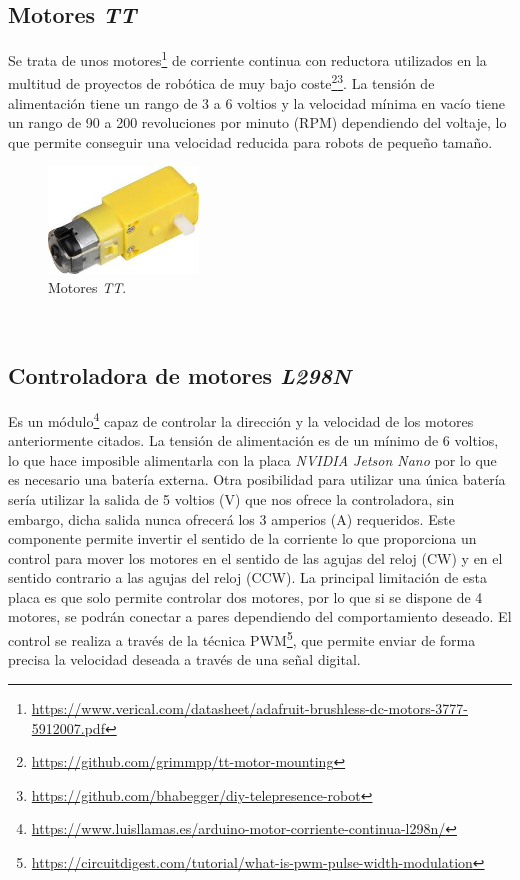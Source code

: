 \subsection{Motores \textit{TT}}
\label{subsection:motortt}
Se trata de unos motores\footnote{\url{https://www.verical.com/datasheet/adafruit-brushless-dc-motors-3777-5912007.pdf}} de corriente continua con reductora utilizados en la multitud de proyectos de robótica de muy bajo coste\footnote{\url{https://github.com/grimmpp/tt-motor-mounting}}\footnote{\url{https://github.com/bhabegger/diy-telepresence-robot}}. La tensión de alimentación tiene un rango de 3 a 6 voltios y la velocidad mínima en vacío tiene un rango de 90 a 200 revoluciones por minuto (RPM) dependiendo del voltaje, lo que permite conseguir una velocidad reducida para robots de pequeño tamaño.\\

\begin{figure} [h!]
	\begin{center}
		\includegraphics[width=4cm]{figs/motorTT}
	\end{center}
	\caption{Motores \textit{TT}.}
	\label{fig:motorTT}
\end{figure}\

\subsection{Controladora de motores \textit{L298N}}
\label{subsection:l298n}
Es un módulo\footnote{\url{https://www.luisllamas.es/arduino-motor-corriente-continua-l298n/}} capaz de controlar la dirección y la velocidad de los motores anteriormente citados. La tensión de alimentación es de un mínimo de 6 voltios, lo que hace imposible alimentarla con la placa \textit{NVIDIA Jetson Nano} por lo que es necesario una batería externa. Otra posibilidad para utilizar una única batería sería utilizar la salida de 5 voltios (V) que nos ofrece la controladora, sin embargo, dicha salida nunca ofrecerá los 3 amperios (A) requeridos. Este componente permite invertir el sentido de la corriente lo que proporciona un control para mover los motores en el sentido de las agujas del reloj (CW) y en el sentido contrario a las agujas del reloj (CCW). La principal limitación de esta placa es que solo permite controlar dos motores, por lo que si se dispone de 4 motores, se podrán conectar a pares dependiendo del comportamiento deseado. El control se realiza a través de la técnica PWM\footnote{\url{https://circuitdigest.com/tutorial/what-is-pwm-pulse-width-modulation}}, que permite enviar de forma precisa la velocidad deseada a través de una señal digital.\\

